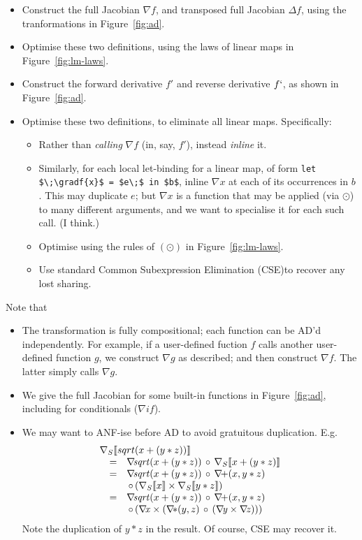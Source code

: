 \documentclass[sigplan,review]{acmart}
\newcommand{\grad}[1]{\nabla_S\lb #1 \rb}  %
\newcommand{\gradf}[1]{\nabla\! \mathit{#1}}  %
\newcommand{\gradft}[1]{\Delta\mathit{#1}}  %
\newcommand{\fwdDf}[1]{f'}  %
\newcommand{\revDf}[1]{f`}  %
\newcommand{\lb}{\llbracket}
\newcommand{\rb}{\rrbracket}
\newcommand{\iffun}{\mathit{if}}
\newcommand{\lmapply}{\odot}   %
\newcommand{\lmcomp}{\,\circ\,}   %
\newcommand{\lmpair}{\times}         %
\begin{document}
\begin{itemize}
\item Construct the full Jacobian $\gradf{f}$, and transposed full Jacobian $\gradft{f}$,
  using the tranformations in Figure~\ref{fig:ad}.
\item Optimise these two definitions, using the laws of linear maps
  in Figure~\ref{fig:lm-laws}.
\item Construct the forward derivative $\fwdDf{f}$ and reverse derivative $\revDf{f}$,
  as shown in Figure~\ref{fig:ad}.
\item Optimise these two definitions, to eliminate all linear maps. Specifically:
  \begin{itemize}
    \item Rather than \emph{calling} $\gradf{f}$ (in, say, $\fwdDf{f}$), instead \emph{inline} it.
    \item Similarly, for each local let-binding for a linear map, of form \lstinline|let $\;\gradf{x}$ = $e\;$ in $b$|,
      inline $\gradf{x}$ at each of its occurrences in $b$. This may duplicate $e$; but $\gradf{x}$ is a function
      that may be applied (via $\lmapply$) to many different arguments, and we want to specialise it for each
      such call.  (I think.)
    \item Optimise using the rules of $(\lmapply)$ in Figure~\ref{fig:lm-laws}.
    \item Use standard Common Subexpression Elimination (CSE)to recover any lost sharing.
  \end{itemize}
\end{itemize}

Note that
\begin{itemize}
\item The transformation is fully compositional; each function can be AD'd independently.
  For example, if a user-defined
  fuction $f$ calls another user-defined function $g$, we construct $\gradf{g}$ as
  described; and then construct $\gradf{f}$. The latter simply calls $\gradf{g}$.
  
\item We give the full Jacobian for some built-in functions in Figure~\ref{fig:ad}, including
  for conditionals ($\gradf{\iffun}$).

\item We may want to ANF-ise before AD to avoid gratuitous duplication.
  E.g.
$$
  \begin{array}{rcl}
    \multicolumn{3}{l}{\grad{sqrt(x+(y*z))}} \\
      & = & \gradf{sqrt}(x+(y*z)) \lmcomp \grad{x+(y*z)} \\
    & = & \gradf{sqrt}(x+(y*z)) \lmcomp  \gradf{+}(x, y*z) \\
     && \lmcomp (\grad{x} \lmpair \grad{y*z}) \\
    & = & \gradf{sqrt}(x+(y*z)) \lmcomp \gradf{+}(x, y*z) \\
    & & \lmcomp (\gradf{x} \lmpair (\gradf{*}(y,z) \lmcomp (\gradf{y} \lmpair \gradf{z}))) \\
  \end{array}
  $$
Note the duplication of $y*z$ in the result.
Of course, CSE may recover it.
\end{itemize}
\end{document}
